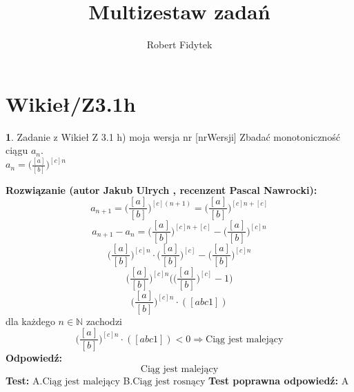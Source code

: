 \documentclass[12pt, a4paper]{article}
\title{Multizestaw zadań}
\author{Robert Fidytek}
\date{}
\theoremstyle{definition} %
\newtheorem{zad}{}
\newcommand{\kategoria}[1]{\section{#1}} %
\newcommand{\zadStart}[1]{\begin{zad}#1\newline} %
\newcommand{\zadStop}{\end{zad}}   %
\newcommand{\rozwStart}[2]{\noindent \textbf{Rozwiązanie (autor #1 , recenzent #2): }\newline} %
\newcommand{\rozwStop}{\newline}                                            %
\newcommand{\odpStart}{\noindent \textbf{Odpowiedź:}\newline}    %
\newcommand{\odpStop}{\newline}                                             %
\newcommand{\testStart}{\noindent \textbf{Test:}\newline} %
\newcommand{\testStop}{\newline} %
\newcommand{\kluczStart}{\noindent \textbf{Test poprawna odpowiedź:}\newline} %
\newcommand{\kluczStop}{\newline} %
\begin{document}
\maketitle


\kategoria{Wikieł/Z3.1h}
\zadStart{Zadanie z Wikieł Z 3.1 h) moja wersja nr [nrWersji]}
Zbadać monotoniczność ciągu $a_{n}$.\\ $a_{n}=\big(\frac{[a]}{[b]}\big)^{[c]n}$
\zadStop
\rozwStart{Jakub Ulrych}{Pascal Nawrocki}
$$a_{n+1}=\bigg(\frac{[a]}{[b]}\bigg)^{[c](n+1)}=\bigg(\frac{[a]}{[b]}\bigg)^{[c]n+[c]}$$
$$a_{n+1}-a_{n}=\bigg(\frac{[a]}{[b]}\bigg)^{[c]n+[c]}-\bigg(\frac{[a]}{[b]}\bigg)^{[c]n}$$
$$\bigg(\frac{[a]}{[b]}\bigg)^{[c]n}\cdot\bigg(\frac{[a]}{[b]}\bigg)^{[c]}-\bigg(\frac{[a]}{[b]}\bigg)^{[c]n}$$
$$\bigg(\frac{[a]}{[b]}\bigg)^{[c]n}\bigg(\bigg(\frac{[a]}{[b]}\bigg)^{[c]}-1\bigg)$$
$$\bigg(\frac{[a]}{[b]}\bigg)^{[c]n}\cdot ([abc1])$$
dla każdego $n\in\mathbb{N}$ zachodzi
$$\bigg(\frac{[a]}{[b]}\bigg)^{[c]n}\cdot ([abc1])<0\Rightarrow \text{Ciąg jest malejący}$$
\rozwStop
\odpStart
$$\text{Ciąg jest malejący}$$
\odpStop
\testStart
A.$\text{Ciąg jest malejący}$
B.$\text{Ciąg jest rosnący}$
\testStop
\kluczStart
A
\kluczStop
\end{document}
